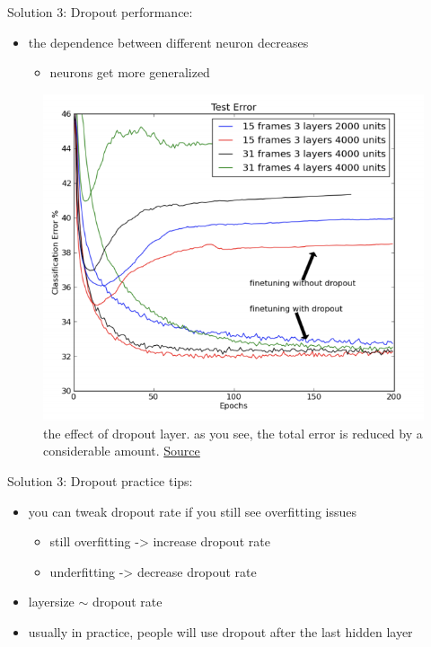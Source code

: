 \begin{frame}{Solution 3: Dropout}
	performance:
	\begin{itemize}
		\item the dependence between different neuron decreases
		\begin{itemize}
			\item neurons get more generalized
		\end{itemize}
	\end{itemize}
	
	\begin{figure}[H]
		\centering
		\includegraphics[height=0.4\textheight]{Figs/section_4/dropout_performance.png}
		\caption{the effect of dropout layer. as you see, the total error is reduced by a considerable amount. \href{https://towardsdatascience.com/understanding-and-implementing-dropout-in-tensorflow-and-keras-a8a3a02c1bfa}{Source}}
	\end{figure}
\end{frame}
\begin{frame}{Solution 3: Dropout}
	practice tips:
	\begin{itemize}
		\item you can tweak dropout rate if you still see overfitting issues
		\begin{itemize}
			\item still overfitting -> increase dropout rate
			\item underfitting -> decrease dropout rate
		\end{itemize}
		\item layersize $\sim$ dropout rate
		\item usually in practice, people will use dropout after the last hidden layer
	\end{itemize}
\end{frame}



